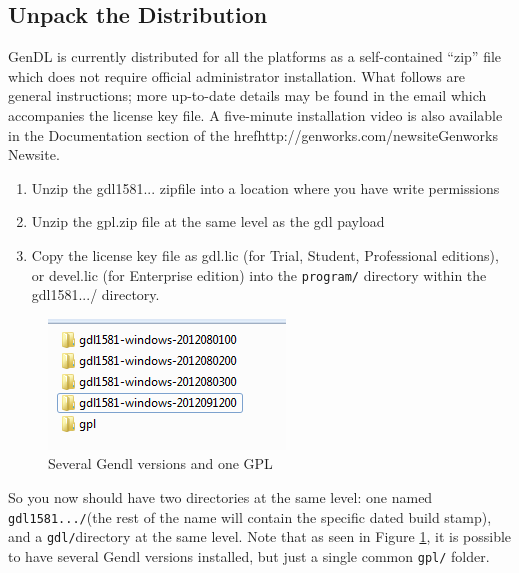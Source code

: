 \documentclass [11pt]{book}
\begin{document}
\subsection{Unpack the Distribution}

\label{subsec:unpackthedistribution}

GenDL is currently distributed for all the platforms as a
self-contained ``zip'' file which does not require official
administrator installation.  What follows are general instructions; more up-to-date details
may be found in the email which accompanies the license key file. A five-minute installation video
is also available in the Documentation section of the href{http://genworks.com/newsite}{Genworks Newsite}.

\begin{enumerate}

\item Unzip the gdl1581... zipfile into a location where you have write permissions

\item Unzip the gpl.zip file at the same level as the gdl payload

\item Copy the license key file as gdl.lic (for Trial,
	 Student, Professional editions), or devel.lic (for Enterprise edition) into the \texttt{program/} directory within the gdl1581.../ directory.

\end{enumerate}


\begin{figure}
\begin{center}
\includegraphics{../images/gendl-installation.png}
\end{center}

\caption{Several Gendl versions and one GPL }

\label{fig:gendl-installation}

\end{figure}
So you now should have two directories at the same level: one named \texttt{gdl1581.../}(the rest of the name will contain the specific dated build stamp), and a \texttt{gdl/}directory at the same level. Note that as seen in Figure 
\ref{fig:gendl-installation}, it is possible to have several Gendl versions installed, but just a single common \texttt{gpl/} folder.
\end{document}
